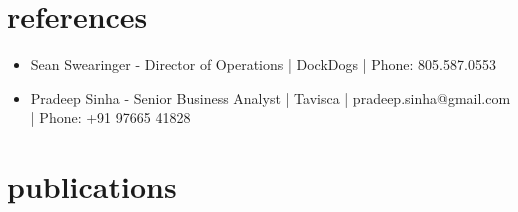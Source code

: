 \documentclass[letterpaper]{twentysecondcv} %
\begin{document}

\section{references}


   \begin{itemize}
	\item Sean Swearinger - Director of Operations | DockDogs | Phone: 805.587.0553
    \item Pradeep Sinha - Senior Business Analyst | Tavisca | pradeep.sinha@gmail.com | Phone: +91 97665 41828
\end{itemize}



\section{publications}

\begin{twentyshort} %
\end{twentyshort}




\end{document}
